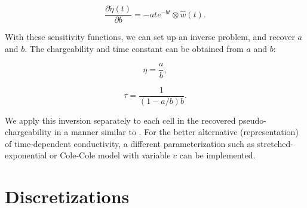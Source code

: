 \documentclass[extra,mreferee]{gji}
\newcommand{\peta}{\tilde{\eta}}
\begin{document}
\begin{linenomath*}
\begin{equation}
  \frac{\partial \peta(t)}{\partial b} = -ate^{-bt} \otimes \hat{w}(t).
\end{equation}
\end{linenomath*}
With these sensitivity functions, we can set up an inverse problem, and recover $a$ and $b$. 
The chargeability and time constant can be obtained from $a$ and $b$:
\begin{linenomath*}
\begin{equation}
  \eta =  \frac{a}{b},
\end{equation}
\end{linenomath*}
\begin{linenomath*}
\begin{equation}
  \tau =  \frac{1}{(1-a/b)b}.
\end{equation}
\end{linenomath*}
We apply this inversion separately to each cell in the recovered pseudo-chargeability  in a manner similar to \cite[]{Yuval1997}.
For the better alternative (representation) of time-dependent conductivity, a different parameterization such as stretched-exponential \cite[]{Kohlrausch1854} or Cole-Cole model with variable $c$ can be implemented.

\section{Discretizations}
\end{document}
